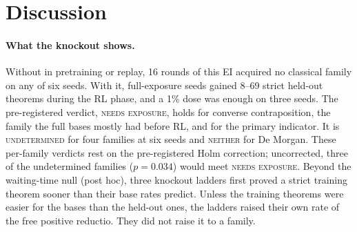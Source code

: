 \section{Discussion}
\label{sec:discussion}

\paragraph{What the knockout shows.} Without \sig{} in pretraining or replay, 16 rounds of this EI acquired no classical
family on any of six seeds. With it, full-exposure seeds gained 8--69 strict held-out theorems during the RL phase, and a
1\% dose was enough on three seeds. The pre-registered verdict, \textsc{needs exposure}, holds for converse
contraposition, the family the full bases mostly had before RL, and for the primary indicator. It is
\textsc{undetermined} for four families at six seeds and \textsc{neither} for De Morgan. \rv{} These per-family verdicts
rest on the pre-registered Holm correction; uncorrected, three of the undetermined families ($p = 0.034$) would meet
\textsc{needs exposure}. Beyond the waiting-time null
(post hoc), three knockout ladders first proved a strict training theorem sooner than their base rates predict. Unless the
training theorems were easier for the bases than the held-out ones, the ladders raised their own rate of the free
positive reductio. They did not raise it to a family.

